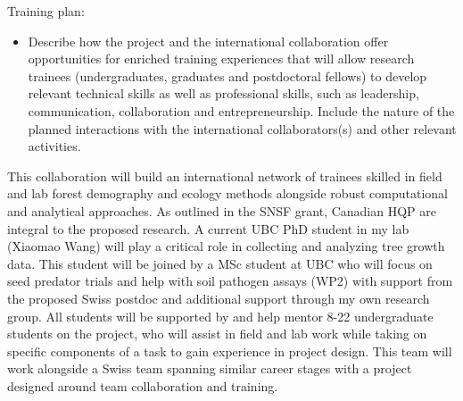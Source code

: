 \documentclass[12pt,oneside]{article}
\newenvironment{smitemize}{
\begin{itemize}
  \setlength{\itemsep}{1pt}
  \setlength{\parskip}{0pt}
  \setlength{\parsep}{0pt}}
{\end{itemize}
}
\begin{document}
{\sc Training plan:}  %
\vspace{-1ex}
\begin{smitemize}
\item  Describe how the project and the international collaboration offer opportunities for enriched training experiences that will allow research trainees (undergraduates, graduates and postdoctoral fellows) to develop relevant technical skills as well as professional skills, such as leadership, communication, collaboration and entrepreneurship. Include the nature of the planned interactions with the international collaborators(s) and other relevant activities.
\end{smitemize}
This collaboration will build an international network of trainees skilled in field and lab forest demography and ecology methods alongside robust computational and analytical approaches. As outlined in the SNSF grant, Canadian HQP are integral to the proposed research. A current UBC PhD student in my lab (Xiaomao Wang) will play a critical role in collecting and analyzing tree growth data. This student will be joined by a MSc student at UBC who will focus on seed predator trials and help with soil pathogen assays (WP2) with support from the proposed Swiss postdoc and additional support through my own research group. All students will be supported by and help mentor 8-22 undergraduate students on the project, who will assist in field and lab work while taking on specific components of a task to gain experience in project design. This team will work alongside a Swiss team spanning similar career stages with a project designed around team collaboration and training.
\end{document}
